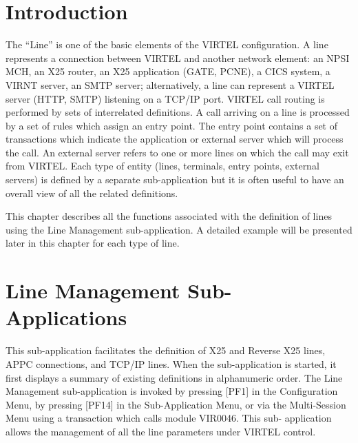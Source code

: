 \documentclass[letterpaper,10pt,english]{sphinxmanual}
\begin{document}
\section{Introduction}
\label{\detokenize{connectivity_guide:introduction}}
The “Line” is one of the basic elements of the VIRTEL configuration. A line represents a connection between VIRTEL and another network element: an NPSI MCH, an X25 router, an X25 application (GATE, PCNE), a CICS system, a VIRNT server, an SMTP server; alternatively, a line can represent a VIRTEL server (HTTP, SMTP) listening on a TCP/IP port. VIRTEL call routing is performed by sets of interrelated definitions. A call arriving on a line is processed by a set of rules which assign an entry point. The entry point contains a set of transactions which indicate the application or external server which will process the call. An external server refers to one or more lines on which the call may exit from VIRTEL. Each type of entity (lines, terminals, entry points, external servers) is defined by a separate sub-application but it is often useful to have an overall view of all the related definitions.

This chapter describes all the functions associated with the definition of lines using the Line Management sub-application. A detailed example will be presented later in
this chapter for each type of line.

\ignorespaces 

\section{Line Management Sub-Applications}
\label{\detokenize{connectivity_guide:line-management-sub-applications}}\label{\detokenize{connectivity_guide:index-5}}
This sub-application facilitates the definition of X25 and Reverse X25 lines, APPC connections, and TCP/IP lines. When the sub-application is started, it first displays a summary of existing definitions in alphanumeric order. The Line Management sub-application is invoked by pressing {[}PF1{]} in the Configuration Menu, by pressing {[}PF14{]} in the Sub-Application Menu, or via the Multi-Session Menu using a transaction which calls module VIR0046. This sub- application allows the management of all the line parameters under VIRTEL control.
\end{document}

